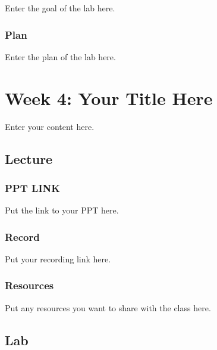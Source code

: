 \documentclass[
  letterpaper,
  oneside]{book}
\numberwithin{equation}{section}
\numberwithin{figure}{section}
\theoremstyle{break}
\begin{document}

Enter the goal of the lab here.

\section*{Plan}\label{plan-2}


Enter the plan of the lab here.

\part{Week 4: Your Title Here}

Enter your content here.

\chapter*{Lecture}\label{lecture-3}


\section*{PPT LINK}\label{ppt-link-3}


Put the link to your PPT here.

\section*{Record}\label{record-3}


Put your recording link here.

\section*{Resources}\label{resources-3}


Put any resources you want to share with the class here.

\chapter*{Lab}\label{lab-3}
\end{document}
